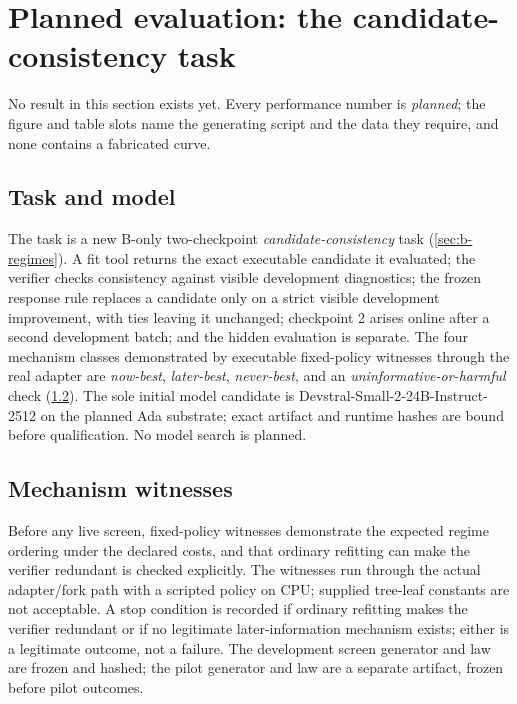 \section{Planned evaluation: the candidate-consistency task}
\label{sec:b-experiments}

No result in this section exists yet.  Every performance number is
\emph{planned}; the figure and table slots name the generating script and the
data they require, and none contains a fabricated curve.

\subsection{Task and model}

The task is a new B-only two-checkpoint \emph{candidate-consistency} task
(\cref{sec:b-regimes}).  A fit tool returns the exact executable candidate it
evaluated; the verifier checks consistency against visible development
diagnostics; the frozen response rule replaces a candidate only on a strict
visible development improvement, with ties leaving it unchanged; checkpoint 2
arises online after a second development batch; and the hidden evaluation is
separate.  The four mechanism classes demonstrated by executable fixed-policy
witnesses through the real adapter are \emph{now-best}, \emph{later-best},
\emph{never-best}, and an \emph{uninformative-or-harmful} check
(\cref{sec:b-witnesses}).  The sole initial model candidate is
Devstral-Small-2-24B-Instruct-2512 on the planned Ada substrate; exact artifact
and runtime hashes are bound before qualification.  No model search is planned.

\subsection{Mechanism witnesses}
\label{sec:b-witnesses}

Before any live screen, fixed-policy witnesses demonstrate the expected regime
ordering under the declared costs, and that ordinary refitting can make the
verifier redundant is checked explicitly.  The witnesses run through the actual
adapter/fork path with a scripted policy on CPU; supplied tree-leaf constants
are not acceptable.  A stop condition is recorded if ordinary refitting makes
the verifier redundant or if no legitimate later-information mechanism exists;
either is a legitimate outcome, not a failure.  The development screen generator
and law are frozen and hashed; the pilot generator and law are a separate
artifact, frozen before pilot outcomes.

